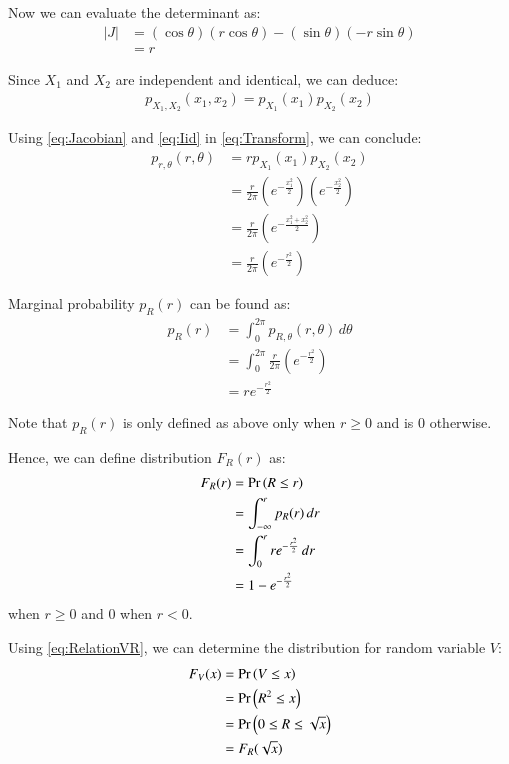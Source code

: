 \documentclass[journal,12pt,twocolumn]{IEEEtran}
\renewcommand\thesection{\arabic{section}}
\begin{document}
\begin{enumerate}[label=\thesection.\arabic*
,ref=\thesection.\theenumi]
	Now we can evaluate the determinant as:
	\begin{align}
		|J| &= \left( \cos{\theta} \right)\left( r\cos{\theta} \right) - \left( \sin{\theta} \right)\left( -r\sin{\theta}\right)\\
		&= r
		\label{eq:Jacobian}
	\end{align}

	Since $X_1$ and $X_2$ are independent and identical, we can deduce:
	\begin{align}
		p_{X_1, X_2}(x_1, x_2) = p_{X_1}(x_1)p_{X_2}(x_2)
		\label{eq:Iid}
	\end{align}

	Using \eqref{eq:Jacobian} and \eqref{eq:Iid} in \eqref{eq:Transform}, we can conclude:
	\begin{align}
		p_{r, \theta}(r, \theta) &= r p_{X_1}(x_1) p_{X_2}(x_2) \\
		&= \frac{r}{2\pi}\left( e^{-\frac{x_1^2}{2}} \right)\left( e^{-\frac{x_2^2}{2}}\right) \\
		&= \frac{r}{2\pi}\left( e^{-\frac{x_1^2 + x_2^2}{2}}\right) \\
		&= \frac{r}{2\pi}\left( e^{-\frac{r^2}{2}}\right)
	\end{align}

	Marginal probability $p_R(r)$ can be found as:
	\begin{align}
		p_R(r) &= \int_0^{2\pi} p_{R, \theta}(r, \theta) \, d\theta \\
		&= \int_0^{2\pi} \frac{r}{2\pi} \left( e^{-\frac{r^2}{2}} \right) \\
		&= r e^{-\frac{r^2}{2}}
		\label{eq:R_PDF}
	\end{align}

	Note that $p_R(r)$ is only defined as above only when $r \geq 0$ and is 0 otherwise.

	Hence, we can define distribution $F_R(r)$ as:
	\begin{align}
		F_R(r) &= \Pr\left(R \leq r\right) \\
		&= \int_{-\infty}^{r} p_R(r) \,dr \\
		&= \int_0^r r e^{-\frac{r^2}{2}} \,dr \\
		&= 1 - e^{-\frac{r^2}{2}}
		\label{eq:R_CDF}
	\end{align}
	when $r \geq 0$ and $0$ when $r < 0$.

	Using \eqref{eq:RelationVR}, we can determine the distribution for random variable $V$:
	\begin{align}
		F_V(x) &= \Pr\left(V \leq x\right) \\
		&= \Pr\left(R^2 \leq x\right) \\
		&= \Pr\left(0 \leq R \leq \sqrt{x}\right) \\
		&= F_R(\sqrt{x})
	\end{align}


\end{enumerate}
\end{document}
